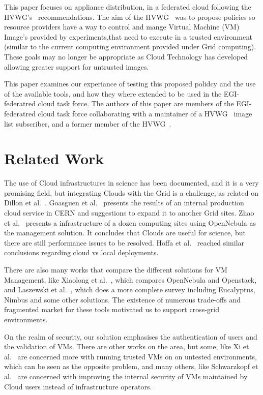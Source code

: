 \documentclass[oribibl]{llncs}
\begin{document}
This paper focuses on appliance distribution, in a federated cloud following the HVWG's~\cite{hepix} recommendations. The aim of the HVWG~\cite{hepix} was to propose policies so resource providers have a way to control and mange Virtual Machine (VM) Image's provided by experiments,that need to execute in a trusted environment (similar to the current computing environment provided under Grid computing). These goals may no longer be appropriate as Cloud Technology has developed allowing greater support for untrusted images.

This paper examines our experiance of testing this proposed polidcy and the use of the available tools, and how they where extended to be used in the EGI-federatred cloud task force. The authors of this paper are members of the EGI-federatred cloud task force collaborating with a maintainer of a HVWG~\cite{hepix} image list subscriber, and a former member of the HVWG~\cite{hepix}.
\section{Related Work}
\label{sect-relatedwork}
The use of Cloud infrastructures in science has been documented, and it is a very promising field, but integrating Clouds with the Grid is a challenge, as related on Dillon et al.~\cite{Dillon2010}. Goasguen et al.~\cite{Goasguen2012} presents the results of an internal production cloud service in CERN and suggestions to expand it to another Grid sites. Zhao et al.~\cite{Zhao2012} presents a infrastructure of a dozen computing sites using OpenNebula as the management solution. It concludes that Clouds are useful for science, but there are still performance issues to be resolved. Hoffa et al.~\cite{Hoffa2008} reached similar conclusions regarding cloud vs local deployments.

There are also many works that compare the different solutions for VM Management, like Xiaolong et al.~\cite{Xiaolong2012}, which compares OpenNebula and Openstack, and Laszewski et al.~\cite{Laszewski2012}, which does a more complete survey including Eucalyptus, Nimbus and some other solutions. The existence of numerous trade-offs and fragmented market for these tools motivated us to support cross-grid environments.

On the realm of security, our solution emphasises the authentication of users and the validation of VMs. There are other works on the area, but some, like Xi et al.~\cite{Xi2012} are concerned more with running trusted VMs on on untested environments, which can be seen as the opposite problem, and many others, like Schwarzkopf et al.~\cite{Schwarzkopf2012} are concerned with improving the internal security of VMs maintained by Cloud users instead of infrastructure operators.
\end{document}
